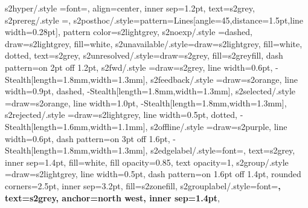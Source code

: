 {  %
  s2hyper/.style  ={font=\ttfamily\tiny, align=center, inner sep=1.2pt,
                    text=s2grey},
%
  s2prereg/.style ={},
  s2posthoc/.style={pattern={Lines[angle=45,distance=1.5pt,line width=0.28pt]},
                    pattern color=s2lightgrey},
  s2noexp/.style  ={dashed, draw=s2lightgrey, fill=white},
  s2unavailable/.style={draw=s2lightgrey, fill=white, dotted, text=s2grey},
  s2unresolved/.style={draw=s2grey, fill=s2greyfill, dash pattern=on 2pt off 1.2pt},
%
  s2fwd/.style      ={draw=s2grey, line width=0.6pt,
                      -{Stealth[length=1.8mm,width=1.3mm]}},
  s2feedback/.style ={draw=s2orange, line width=0.9pt, dashed,
                      -{Stealth[length=1.8mm,width=1.3mm]}},
  s2selected/.style ={draw=s2orange, line width=1.0pt,
                      -{Stealth[length=1.8mm,width=1.3mm]}},
  s2rejected/.style ={draw=s2lightgrey, line width=0.5pt, dotted,
                      -{Stealth[length=1.6mm,width=1.1mm]}},
  s2offline/.style  ={draw=s2purple, line width=0.6pt, dash pattern=on 3pt off 1.6pt,
                      -{Stealth[length=1.8mm,width=1.3mm]}},
  s2edgelabel/.style={font=\tiny, text=s2grey, inner sep=1.4pt,
                      fill=white, fill opacity=0.85, text opacity=1},
%
  s2group/.style    ={draw=s2lightgrey, line width=0.5pt, dash pattern=on 1.6pt off 1.4pt,
                      rounded corners=2.5pt, inner sep=3.2pt, fill=s2zonefill},
  s2grouplabel/.style={font=\tiny\bfseries, text=s2grey, anchor=north west,
                      inner sep=1.4pt},
%
}

